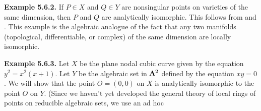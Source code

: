 {\smallskip
\noindent\hypertarget{result-I-5.6.2}{}\textbf{Example 5.6.2.} If $P\in X$ and $Q\in Y$ are nonsingular points on varieties of the same dimension, then $P$ and $Q$ are analytically isomorphic. This follows from  and . This example is the algebraic analogue of the fact that any two manifolds (topological, differentiable, or complex) of the same dimension are locally isomorphic.

\smallskip
\noindent\hypertarget{result-I-5.6.3}{}\textbf{Example 5.6.3.} Let $X$ be the plane nodal cubic curve given by the equation $y^2=x^2(x+1)$. Let $Y$ be the algebraic set in $\AffSpace{2}$ defined by the equation $xy=0$. We will show that the point $O=(0,0)$ on $X$ is analytically isomorphic to the point $O$ on $Y$. (Since we haven't yet developed the general theory of local rings of points on reducible algebraic sets, we use an ad hoc}
